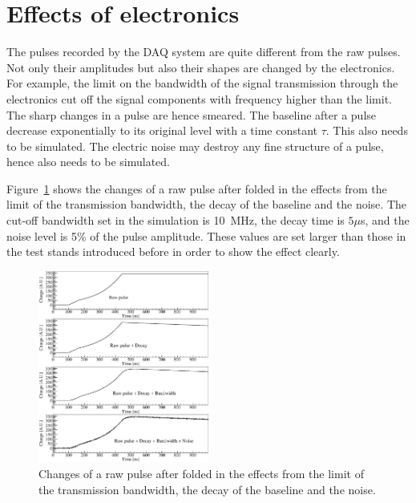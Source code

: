\section{Effects of electronics}
\label{sec:pss:dbn}
The pulses recorded by the DAQ system are quite different from the raw pulses. Not only their amplitudes but also their shapes are changed by the electronics. For example, the limit on the bandwidth of the signal transmission through the electronics cut off the signal components with frequency higher than the limit. The sharp changes in a pulse are hence smeared. The baseline after a pulse decrease exponentially to its original level with a time constant $\tau$. This also needs to be simulated. The electric noise may destroy any fine structure of a pulse, hence also needs to be simulated.

Figure~\ref{fig:pss:elec} shows the changes of a raw pulse after folded in the effects from the limit of the transmission bandwidth, the decay of the baseline and the noise. The cut-off bandwidth set in the simulation is 10~MHz, the decay time is $5 \mu$s, and the noise level is 5\% of the pulse amplitude. These values are set larger than those in the test stands introduced before in order to show the effect clearly.
\begin{figure}
\centering
\includegraphics[width=0.5\textwidth]{PSDBN}
\caption{Changes of a raw pulse after folded in the effects from the limit of the transmission bandwidth, the decay of the baseline and the noise.}
\label{fig:pss:elec}
\end{figure}


